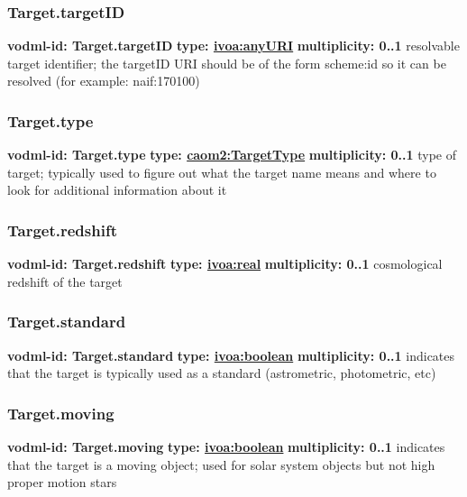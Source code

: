     \subsubsection{Target.targetID}
      \textbf{vodml-id: Target.targetID} \newline
      \textbf{type: \hyperref[sect:ivoa]{ivoa:anyURI}} \newline
      \textbf{multiplicity: 0..1} \newline
      resolvable target identifier; the targetID URI should be of the form {scheme}:{id} so it can be resolved (for example: naif:170100)

    \subsubsection{Target.type}
      \textbf{vodml-id: Target.type} \newline
      \textbf{type: \hyperref[sect:TargetType]{caom2:TargetType}} \newline
      \textbf{multiplicity: 0..1} \newline
      type of target; typically used to figure out what the target name means and where to look for additional information about it

    \subsubsection{Target.redshift}
      \textbf{vodml-id: Target.redshift} \newline
      \textbf{type: \hyperref[sect:ivoa]{ivoa:real}} \newline
      \textbf{multiplicity: 0..1} \newline
      cosmological redshift of the target

    \subsubsection{Target.standard}
      \textbf{vodml-id: Target.standard} \newline
      \textbf{type: \hyperref[sect:ivoa]{ivoa:boolean}} \newline
      \textbf{multiplicity: 0..1} \newline
      indicates that the target is typically used as a standard (astrometric, photometric, etc)

    \subsubsection{Target.moving}
      \textbf{vodml-id: Target.moving} \newline
      \textbf{type: \hyperref[sect:ivoa]{ivoa:boolean}} \newline
      \textbf{multiplicity: 0..1} \newline
      indicates that the target is a moving object; used for solar system objects but not high proper motion stars


